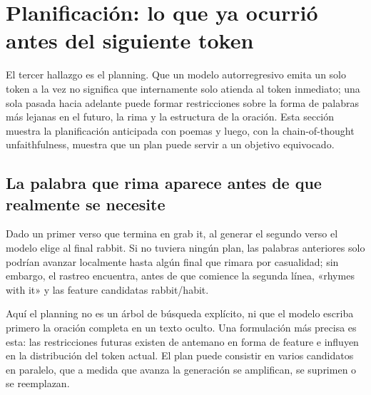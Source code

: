\section{Planificación: lo que ya ocurrió antes del siguiente token}

El tercer hallazgo es el planning. Que un modelo autorregresivo emita un solo token a la vez no significa que internamente solo atienda al token inmediato; una sola pasada hacia adelante puede formar restricciones sobre la forma de palabras más lejanas en el futuro, la rima y la estructura de la oración. Esta sección muestra la planificación anticipada con poemas y luego, con la chain-of-thought unfaithfulness, muestra que un plan puede servir a un objetivo equivocado.


\subsection{La palabra que rima aparece antes de que realmente se necesite}

Dado un primer verso que termina en grab it, al generar el segundo verso el modelo elige al final rabbit. Si no tuviera ningún plan, las palabras anteriores solo podrían avanzar localmente hasta algún final que rimara por casualidad; sin embargo, el rastreo encuentra, antes de que comience la segunda línea, «rhymes with it» y las feature candidatas rabbit/habit.



Aquí el planning no es un árbol de búsqueda explícito, ni que el modelo escriba primero la oración completa en un texto oculto. Una formulación más precisa es esta: las restricciones futuras existen de antemano en forma de feature e influyen en la distribución del token actual. El plan puede consistir en varios candidatos en paralelo, que a medida que avanza la generación se amplifican, se suprimen o se reemplazan.


